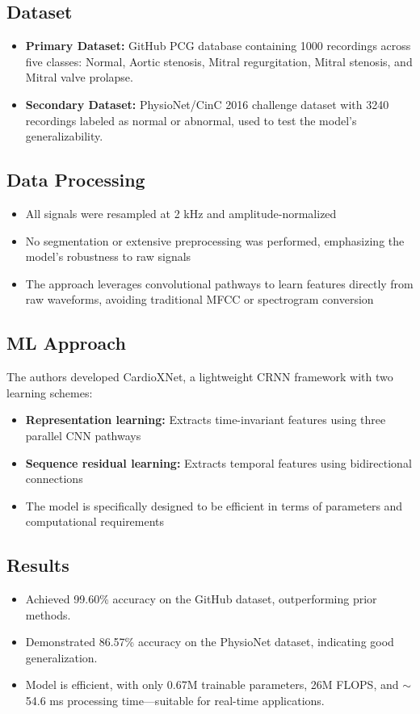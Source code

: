 \subsection*{Dataset}
\begin{itemize}
    \item \textbf{Primary Dataset:} GitHub PCG database containing 1000 recordings across five classes: Normal, Aortic stenosis, Mitral regurgitation, Mitral stenosis, and Mitral valve prolapse.
    \item \textbf{Secondary Dataset:} PhysioNet/CinC 2016 challenge dataset with 3240 recordings labeled as normal or abnormal, used to test the model's generalizability.
\end{itemize}

\subsection*{Data Processing}
\begin{itemize}
    \item All signals were resampled at 2 kHz and amplitude-normalized
    \item No segmentation or extensive preprocessing was performed, emphasizing the model's robustness to raw signals
    \item The approach leverages convolutional pathways to learn features directly from raw waveforms, avoiding traditional MFCC or spectrogram conversion
\end{itemize}

\subsection*{ML Approach}
The authors developed CardioXNet, a lightweight CRNN framework with two learning schemes:
\begin{itemize}
    \item \textbf{Representation learning:} Extracts time-invariant features using three parallel CNN pathways
    \item \textbf{Sequence residual learning:} Extracts temporal features using bidirectional connections
    \item The model is specifically designed to be efficient in terms of parameters and computational requirements
\end{itemize}

\subsection*{Results}
\begin{itemize}
    \item Achieved 99.60\% accuracy on the GitHub dataset, outperforming prior methods.
    \item Demonstrated 86.57\% accuracy on the PhysioNet dataset, indicating good generalization.
    \item Model is efficient, with only 0.67M trainable parameters, 26M FLOPS, and $\sim$54.6 ms processing time—suitable for real-time applications.
\end{itemize}

